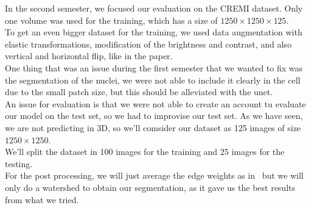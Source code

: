 In the second semester, we focused our evaluation on the CREMI dataset. Only
one volume was used for the training, which has a size of $1250\times 1250\times 125$.\\
To get an even bigger dataset for the training, we used data augmentation with
elastic transformations, modification of the brightness and contrast, and also vertical and horizontal flip, like in the paper.\\

One thing that was an issue during the first semester that we wanted to fix was
the segmentation of the nuclei, we were not able to include it clearly in the
cell due to the small patch size, but this should be alleviated with the
unet.\\

An issue for evaluation is that we were not able to create an account tu
evaluate our model on the test set, so we had to improvise our test set.
As we have seen, we are not predicting in 3D, so we’ll comsider our dataset as 125 images of size $1250\times 1250$.\\ 
We’ll split the dataset in 100 images for the training and 25 images for the testing.\\

For the post processing, we will just average the edge weights as
in~\cite{funke_large_2019} but we will only do a watershed to obtain our
segmentation, as it gave us the best results from what we tried.

